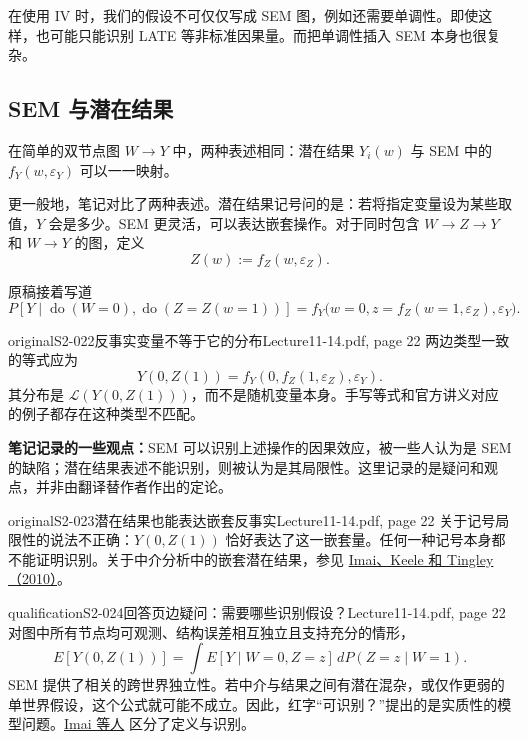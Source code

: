在使用 IV 时，我们的假设不可仅仅写成 SEM 图，例如还需要单调性。即使这样，也可能只能识别 LATE 等非标准因果量。而把单调性插入 SEM 本身也很复杂。

\subsection{SEM 与潜在结果}
在简单的双节点图 $W\to Y$ 中，两种表述相同：潜在结果 $Y_i(w)$ 与 SEM 中的 $f_Y(w,\varepsilon_Y)$ 可以一一映射。

更一般地，笔记对比了两种表述。潜在结果记号问的是：若将指定变量设为某些取值，$Y$ 会是多少。SEM 更灵活，可以表达嵌套操作。对于同时包含 $W\to Z\to Y$ 和 $W\to Y$ 的图，定义
\[
 Z(w):=f_Z(w,\varepsilon_Z).
\]
\begin{center}
\end{center}
原稿接着写道
\[
 P[Y\mid\operatorname{do}(W=0),\operatorname{do}(Z=Z(w=1))]
 =f_Y\bigl(w=0,z=f_Z(w=1,\varepsilon_Z),\varepsilon_Y\bigr).
\]
\begin{reviewnote}{original}{S2-022}{反事实变量不等于它的分布}{Lecture11-14.pdf, page 22}
两边类型一致的等式应为
\[
 Y(0,Z(1))=f_Y(0,f_Z(1,\varepsilon_Z),\varepsilon_Y).
\]
其分布是 $\mathcal L(Y(0,Z(1)))$，而不是随机变量本身。手写等式和官方讲义对应的例子都存在这种类型不匹配。
\end{reviewnote}


\textbf{笔记记录的一些观点：}SEM 可以识别上述操作的因果效应，被一些人认为是 SEM 的缺陷；潜在结果表述不能识别，则被认为是其局限性。这里记录的是疑问和观点，并非由翻译替作者作出的定论。

\begin{reviewnote}{original}{S2-023}{潜在结果也能表达嵌套反事实}{Lecture11-14.pdf, page 22}
关于记号局限性的说法不正确：$Y(0,Z(1))$ 恰好表达了这一嵌套量。任何一种记号本身都不能证明识别。关于中介分析中的嵌套潜在结果，参见 \href{https://imai.sites.fas.harvard.edu/research/files/BaronKenny.pdf}{Imai、Keele 和 Tingley（2010）}。
\end{reviewnote}

\begin{reviewnote}{qualification}{S2-024}{回答页边疑问：需要哪些识别假设？}{Lecture11-14.pdf, page 22}
对图中所有节点均可观测、结构误差相互独立且支持充分的情形，
\[
 E[Y(0,Z(1))]=\int E[Y\mid W=0,Z=z]\,dP(Z=z\mid W=1).
\]
SEM 提供了相关的跨世界独立性。若中介与结果之间有潜在混杂，或仅作更弱的单世界假设，这个公式就可能不成立。因此，红字“可识别？”提出的是实质性的模型问题。\href{https://imai.sites.fas.harvard.edu/research/files/BaronKenny.pdf}{Imai 等人} 区分了定义与识别。
\end{reviewnote}


